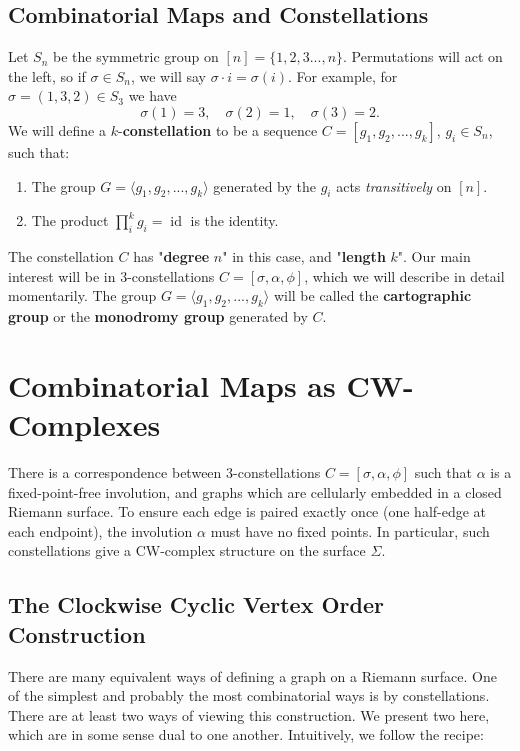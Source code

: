 \documentclass[11pt,oneside]{amsbook}
\numberwithin{equation}{section}
\theoremstyle{plain}
\theoremstyle{definition}
\theoremstyle{remark}
\DeclareMathOperator{\id}{\mathrm{id}}
\newcommand{\la}{\langle}
\newcommand{\ra}{\rangle}
\begin{document}
	\subsection{Combinatorial Maps and Constellations}
	Let $S_n$ be the symmetric group on $[n] = \{1,2,3...,n\}$. Permutations will act on the left, so if $\sigma \in S_n$, we will say $\sigma \cdot i = \sigma(i)$. For example, for $\sigma = (1,3,2) \in S_3$ we have
	\[ \sigma(1) = 3, \quad \sigma(2) = 1, \quad \sigma(3) = 2.\]
	We will define a $k$-\textbf{constellation} to be a sequence $C=[g_1, g_2, ..., g_k]$, $g_i \in S_n$, such that:
	\begin{enumerate}
		\item The group $G = \la g_1, g_2, ..., g_k \ra$ generated by the $g_i$ acts \textit{transitively} on $[n]$. 
		\item The product $\prod_i^k g_i = \id$ is the identity. 
	\end{enumerate}
	The constellation $C$ has "\textbf{degree} $n$" in this case, and "\textbf{length} $k$". Our main interest will be in $3$-constellations $C = [\sigma, \alpha, \phi]$, which we will describe in detail momentarily. The group $G = \la g_1, g_2, ..., g_k \ra$ will be called the \textbf{cartographic group} or the \textbf{monodromy group} generated by $C$. 
	
	
	\section{Combinatorial Maps as CW-Complexes}
	There is a correspondence between $3$-constellations $C = [\sigma, \alpha, \phi]$ such that $\alpha$ is a fixed-point-free involution, and graphs which are cellularly embedded in a closed Riemann surface.  To ensure each edge is paired exactly once (one half-edge at each endpoint), the involution $\alpha$ must have no fixed points. In particular, such constellations give a CW-complex structure on the surface $\Sigma$. 
	
	
	\subsection{The Clockwise Cyclic Vertex Order Construction}
	There are many equivalent ways of defining a graph on a Riemann surface. One of the simplest and probably the most combinatorial ways is by constellations. There are at least two ways of viewing this construction. We present two here, which are in some sense dual to one another. Intuitively, we follow the recipe:
	
\end{document}
